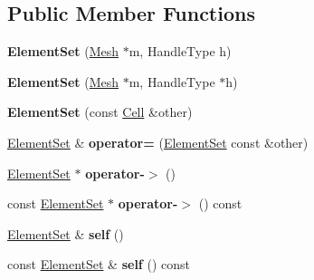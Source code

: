 \subsection*{Public Member Functions}
\begin{DoxyCompactItemize}
\item 
\hypertarget{classINMOST_1_1ElementSet_a6aed94d3dcaeeaaeab9a3d9fe599d903}{{\bfseries Element\-Set} (\hyperlink{classINMOST_1_1Mesh}{Mesh} $\ast$m, Handle\-Type h)}\label{classINMOST_1_1ElementSet_a6aed94d3dcaeeaaeab9a3d9fe599d903}

\item 
\hypertarget{classINMOST_1_1ElementSet_ae58454f19b83823fbe19cf97932ba91d}{{\bfseries Element\-Set} (\hyperlink{classINMOST_1_1Mesh}{Mesh} $\ast$m, Handle\-Type $\ast$h)}\label{classINMOST_1_1ElementSet_ae58454f19b83823fbe19cf97932ba91d}

\item 
\hypertarget{classINMOST_1_1ElementSet_ae113d4ca56a6d5e9a8e6da68adb85135}{{\bfseries Element\-Set} (const \hyperlink{classINMOST_1_1Cell}{Cell} \&other)}\label{classINMOST_1_1ElementSet_ae113d4ca56a6d5e9a8e6da68adb85135}

\item 
\hypertarget{classINMOST_1_1ElementSet_a23d05143e6c17d9d0160970fe9e77f0d}{\hyperlink{classINMOST_1_1ElementSet}{Element\-Set} \& {\bfseries operator=} (\hyperlink{classINMOST_1_1ElementSet}{Element\-Set} const \&other)}\label{classINMOST_1_1ElementSet_a23d05143e6c17d9d0160970fe9e77f0d}

\item 
\hypertarget{classINMOST_1_1ElementSet_aa449d57fb308e75a4133aff074810cd8}{\hyperlink{classINMOST_1_1ElementSet}{Element\-Set} $\ast$ {\bfseries operator-\/$>$} ()}\label{classINMOST_1_1ElementSet_aa449d57fb308e75a4133aff074810cd8}

\item 
\hypertarget{classINMOST_1_1ElementSet_a30d53f550120f3233cf4a07816d70d5a}{const \hyperlink{classINMOST_1_1ElementSet}{Element\-Set} $\ast$ {\bfseries operator-\/$>$} () const }\label{classINMOST_1_1ElementSet_a30d53f550120f3233cf4a07816d70d5a}

\item 
\hypertarget{classINMOST_1_1ElementSet_a020ccd702ebc614cc4eb8b7f07ea0921}{\hyperlink{classINMOST_1_1ElementSet}{Element\-Set} \& {\bfseries self} ()}\label{classINMOST_1_1ElementSet_a020ccd702ebc614cc4eb8b7f07ea0921}

\item 
\hypertarget{classINMOST_1_1ElementSet_aac32b559e5b4134dd756f8eabb9ea6a6}{const \hyperlink{classINMOST_1_1ElementSet}{Element\-Set} \& {\bfseries self} () const }\label{classINMOST_1_1ElementSet_aac32b559e5b4134dd756f8eabb9ea6a6}


\end{DoxyCompactItemize}
